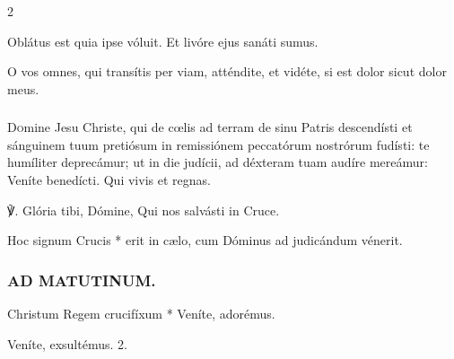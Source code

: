 \documentclass[9pt,twoside]{extarticle}
\begin{document}
\begin{multicols}{2}
\begin{tightlist}{}
\item {} Oblátus est quia ipse vóluit.  Et livóre ejus sanáti sumus.
\item {} O vos omnes, qui transítis per viam, atténdite, et vidéte, si est dolor sicut dolor meus.
\end{tightlist}

\subsubsection*{\center {}}
\lettrine{D}omine Jesu Christe, qui de cœlis ad terram de sinu Patris descendísti et sánguinem tuum pretiósum in remissiónem peccatórum nostrórum fudísti: te humíliter deprecámur; ut in die judícii, ad déxteram tuam audíre mereámur: Veníte benedícti. Qui vivis et regnas.

\begin{tightlist}{}
\item {} ℣. Glória tibi, Dómine, Qui nos salvásti in Cruce.
\item {}
\item {} Hoc signum Crucis * erit in cælo, cum Dóminus ad judicándum vénerit.
\end{tightlist}

\subsubsection*{\center \textsc{AD MATUTINUM.}}
\begin{tightlist}{}
\item {} Christum Regem crucifíxum * Veníte, adorémus.
\item {} Veníte, exsultémus. 2. 
\end{tightlist}

\end{multicols}
\end{document}
